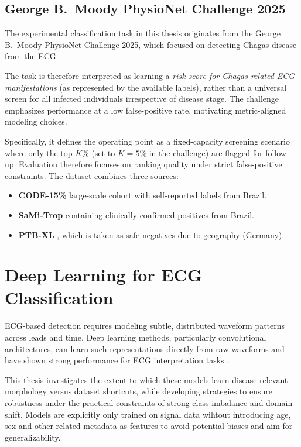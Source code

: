 \subsection*{George B.~Moody PhysioNet Challenge 2025}
The experimental classification task in this thesis originates from the George B.~Moody PhysioNet Challenge 2025, which focused on detecting Chagas disease from the ECG \parencite{2025ChallengeCinC}.

The task is therefore interpreted as learning a \emph{risk score for Chagas-related ECG manifestations} (as represented by the available labels), rather than a universal screen for all infected individuals irrespective of disease stage.
The challenge emphasizes performance at a low false-positive rate, motivating metric-aligned modeling choices.

Specifically, it defines the operating point as a fixed-capacity screening scenario where only the top $K\%$ (set to $K=5\%$ in the challenge) are flagged for follow-up.
Evaluation therefore focuses on ranking quality under strict false-positive constraints.
The dataset combines three sources:
\begin{itemize}
  \item \textbf{CODE-15\%} large-scale cohort \parencite{ribeiro_code-15_2021} with self-reported labels from Brazil.
  \item \textbf{SaMi-Trop} \parencite{ribeiro_sami-trop_2021} containing clinically confirmed positives from Brazil.
  \item \textbf{PTB-XL} \parencite{wagner_ptb_xl}, which is taken as safe negatives due to geography (Germany).
\end{itemize}



\section{Deep Learning for ECG Classification}
ECG-based detection requires modeling subtle, distributed waveform patterns across leads and time.
Deep learning methods, particularly convolutional architectures, can learn such representations directly from raw waveforms and have shown strong performance for ECG interpretation tasks \parencite{jidling_screening_2023}.

This thesis investigates the extent to which these models learn disease-relevant morphology versus dataset shortcuts, while developing strategies to ensure robustness under the practical constraints of strong class imbalance and domain shift.
Models are explicitly only trained on signal data wihtout introducing age, sex and other related metadata as features to avoid potential biases and aim for generalizability.

